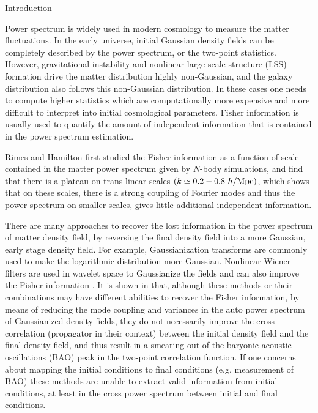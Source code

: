 \begin{section}{Introduction}\label{sec:introduction}  

Power spectrum is widely used in modern cosmology to measure the matter
fluctuations. In the early universe, initial Gaussian density fields
can be completely described by the power spectrum, or the two-point
statistics. However, gravitational instability and nonlinear large scale
structure (LSS) formation drive the matter distribution highly
non-Gaussian, and the galaxy distribution also follows this non-Gaussian
distribution. In these cases one needs to compute higher statistics
which are computationally more expensive and more difficult to
interpret into initial cosmological parameters. Fisher information
is usually used to quantify the amount of independent information
that is contained in the power spectrum estimation.

Rimes and Hamilton \citep{bib:Rimes2006} first studied the Fisher
information as a function of scale contained in the matter power
spectrum given by $N$-body simulations, and find that there is a
plateau on trans-linear scales $(k \simeq 0.2-0.8\ h/{\rm Mpc})$,
which shows that on these scales, there is a strong coupling of
Fourier modes and thus the power spectrum on smaller scales, gives little
additional independent information.

There are many approaches to recover the lost information in the
power spectrum of matter density field, by reversing the final
density field into a more Gaussian, early stage density field.
For example, Gaussianization transforms are commonly used
\citep{1992MNRAS.254..315W,bib:Mark2009} to make the logarithmic
distribution more Gaussian. Nonlinear Wiener filters are used
in wavelet space to Gaussianize the fields and can also improve
the Fisher information \citep{bib:Zhang2011,bib:Yu2012,2013MNRAS.436..759H}.
It is shown in \cite{2013MNRAS.436..759H} that, although these methods
or their combinations may have different abilities to recover
the Fisher information, by means of reducing the mode coupling
and variances in the auto power spectrum of Gaussianized
density fields, they do not necessarily improve the cross correlation
(propagator in their context) between the initial density
field and the final density field, and thus result in a smearing
out of the baryonic acoustic oscillations (BAO) peak in the two-point
correlation function. If one concerns about mapping
the initial conditions to final conditions (e.g. measurement of 
BAO) these methods are unable to
extract valid information from initial conditions, at least in
the cross power spectrum between initial and final conditions.


\end{section}
